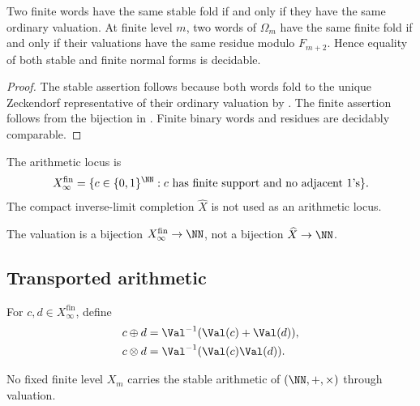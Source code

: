 \begin{proposition}
\label{prop:fold-confluence}
Two finite words have the same stable fold if and only if they have the same
ordinary valuation.  At finite level \(m\), two words of \(\Omega_m\) have the
same finite fold if and only if their valuations have the same residue modulo
\(F_{m+2}\).  Hence equality of both stable and finite normal forms is decidable.
\end{proposition}

\begin{proof}
The stable assertion follows because both words fold to the unique Zeckendorf
representative of their ordinary valuation by
.  The finite assertion follows from the
bijection in .  Finite binary
words and residues are decidably comparable.
\end{proof}

\begin{definition}[Completions]\label{def:completions}
The arithmetic locus is
\begin{equation}\label{eq:X-infty}
  X_\infty^{\mathrm{fin}}
  =\{c\in\{0,1\}^{\NN}: c\text{ has finite support and no adjacent }1\text{'s}\}.
\end{equation}
The compact inverse-limit completion \(\widehat X\) is not used as an arithmetic
locus.
\end{definition}

\begin{remark}\label{rem:finite-vs-profinite}
The valuation is a bijection \(X_\infty^{\mathrm{fin}}\to\NN\), not a bijection
\(\widehat X\to\NN\).
\end{remark}

\subsection{Transported arithmetic}\label{ssec:arith}

\begin{definition}\label{def:stable-arith}
For \(c,d\in X_\infty^{\mathrm{fin}}\), define
\begin{align}
  c\oplus d&=\Val^{-1}(\Val(c)+\Val(d)),\label{eq:stable-add}\\
  c\otimes d&=\Val^{-1}(\Val(c)\Val(d)).\label{eq:stable-mul}
\end{align}
\end{definition}

\begin{proposition}
\label{prop:finite-residue-not-stable}
No fixed finite level \(X_m\) carries the stable arithmetic of
\((\NN,+,\times)\) through valuation.
\end{proposition}

